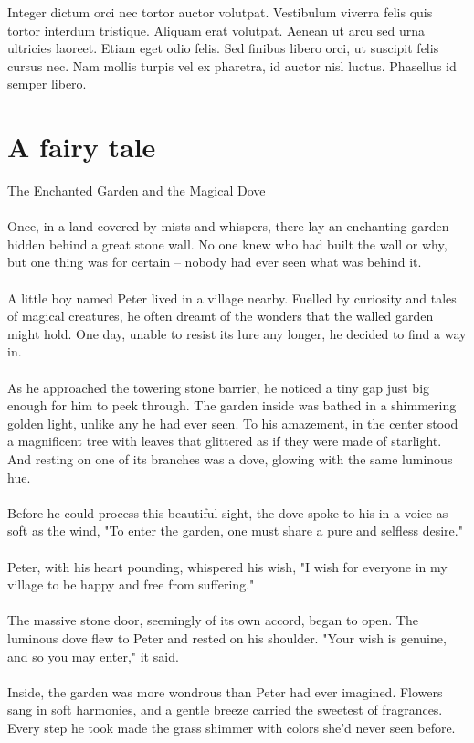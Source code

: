 \documentclass[10pt, fullpage, a4paper, titlepage]{article}
\begin{document}
Integer dictum orci nec tortor auctor volutpat. Vestibulum viverra felis quis tortor interdum tristique. Aliquam erat volutpat. Aenean ut arcu sed urna ultricies laoreet. Etiam eget odio felis. Sed finibus libero orci, ut suscipit felis cursus nec. Nam mollis turpis vel ex pharetra, id auctor nisl luctus. Phasellus id semper libero.

\section{A fairy tale}

The Enchanted Garden and the Magical Dove
\\~\\
Once, in a land covered by mists and whispers, there lay an enchanting garden hidden behind a great stone wall. No one knew who had built the wall or why, but one thing was for certain – nobody had ever seen what was behind it.
\\~\\
A little boy named Peter lived in a village nearby. Fuelled by curiosity and tales of magical creatures, he often dreamt of the wonders that the walled garden might hold. One day, unable to resist its lure any longer, he decided to find a way in.
\\~\\
As he approached the towering stone barrier, he noticed a tiny gap just big enough for him to peek through. The garden inside was bathed in a shimmering golden light, unlike any he had ever seen. To his amazement, in the center stood a magnificent tree with leaves that glittered as if they were made of starlight. And resting on one of its branches was a dove, glowing with the same luminous hue.
\\~\\
Before he could process this beautiful sight, the dove spoke to his in a voice as soft as the wind, "To enter the garden, one must share a pure and selfless desire."
\\~\\
Peter, with his heart pounding, whispered his wish, "I wish for everyone in my village to be happy and free from suffering."
\\~\\
The massive stone door, seemingly of its own accord, began to open. The luminous dove flew to Peter and rested on his shoulder. "Your wish is genuine, and so you may enter," it said.
\\~\\
Inside, the garden was more wondrous than Peter had ever imagined. Flowers sang in soft harmonies, and a gentle breeze carried the sweetest of fragrances. Every step he took made the grass shimmer with colors she'd never seen before.
\end{document}
